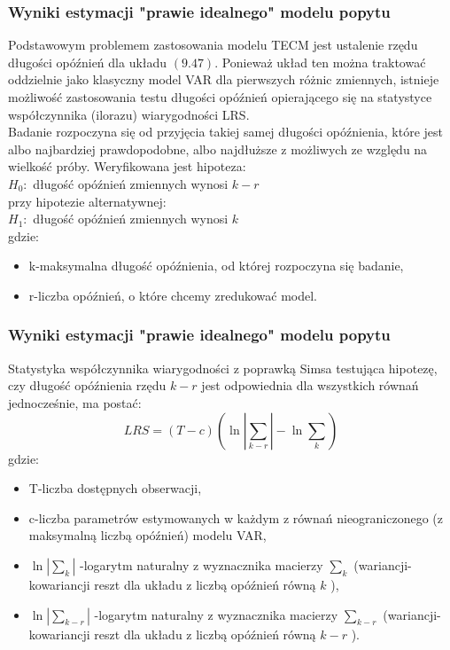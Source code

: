 \documentclass[11pt,usenames,dvipsnames,svgnames,x11names]{beamer}\usepackage[]{graphicx}\usepackage[]{color}
\theoremstyle{definition}
\theoremstyle{remark}
\begin{document}
\begin{frame}

\frametitle{Wyniki estymacji "prawie idealnego" modelu popytu }

Podstawowym problemem zastosowania modelu TECM jest ustalenie rzędu długości opóźnień dla układu $(9.47)$. Ponieważ układ ten można traktować oddzielnie jako klasyczny model VAR dla pierwszych różnic zmiennych, istnieje możliwość zastosowania testu długości opóźnień opierającego się na statystyce współczynnika (ilorazu) wiarygodności LRS.\\
Badanie rozpoczyna się od przyjęcia takiej samej długości opóźnienia, które jest albo najbardziej prawdopodobne, albo najdłuższe z możliwych ze względu na wielkość próby. Weryfikowana jest hipoteza: \\
$H_0:$  długość opóźnień zmiennych wynosi $k-r$   \\
przy hipotezie alternatywnej:\\
$H_1:$  długość opóźnień zmiennych wynosi $k$  \\
gdzie:
\begin{itemize}
\item k-maksymalna długość opóźnienia, od której rozpoczyna się badanie,
\item r-liczba opóźnień, o które chcemy zredukować model.
\end{itemize}
\end{frame}

\begin{frame}
\frametitle{Wyniki estymacji "prawie idealnego" modelu popytu }
Statystyka współczynnika wiarygodności z poprawką Simsa testująca hipotezę, czy długość opóźnienia rzędu $k-r$ jest odpowiednia dla wszystkich równań jednocześnie, ma postać:
$$ LRS=(T-c) (\ln | \sum_{k-r} | - \ln \sum_{k})  $$
gdzie:
\begin{itemize}
\item T-liczba dostępnych obserwacji,
\item c-liczba parametrów estymowanych w każdym z równań nieograniczonego (z maksymalną liczbą opóźnień) modelu VAR,
\item $\ln | \sum_{k} | $ -logarytm naturalny z wyznacznika macierzy 
$ \sum_{k}$ (wariancji-kowariancji reszt dla układu z liczbą opóźnień równą $k$ ),
\item $\ln | \sum_{k-r} | $ -logarytm naturalny z wyznacznika macierzy 
$ \sum_{k-r}$ (wariancji-kowariancji reszt dla układu z liczbą opóźnień równą $k-r$ ).

\end{itemize}
\end{frame}
\end{document}
